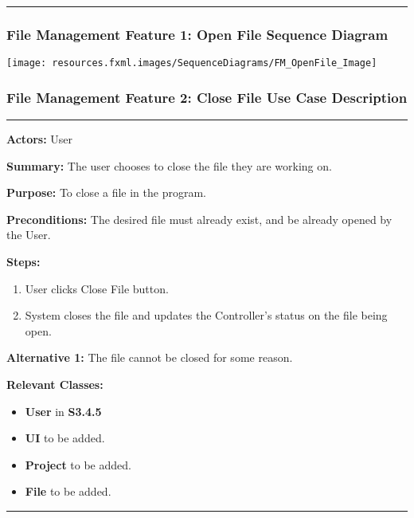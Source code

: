 \documentclass[twoside,letterpaper]{article}
\begin{document}
\hrule

\newpage

\subsubsection[File Management Feature 1: Open File Sequence Diagram]{\rmfamily\bfseries\color{black}
	File Management Feature 1: Open File Sequence Diagram}
\hypertarget{RefHeading22059017292}{}

\bigskip

\texttt{[image: resources.fxml.images/SequenceDiagrams/FM\_OpenFile\_Image]}

\newpage

\subsubsection[File Management Feature 2: Close File Use Case Description]{\rmfamily\bfseries\color{black}
	File Management Feature 2: Close File Use Case Description}
\hypertarget{RefHeading22059017292}{}

\vspace{2pt}
\hrule
\vspace{8pt}
\textbf{Actors:} User \newline

\noindent\textbf{Summary:} The user chooses to close the file they are working on. \newline

\noindent\textbf{Purpose:} To close a file in the program. \newline

\noindent\textbf{Preconditions:} The desired file must already exist, and be already opened by the User. \newline

\noindent\textbf{Steps:}
\begin{enumerate}
	\item User clicks Close File button.
	\item System closes the file and updates the Controller's status on the file being open.
\end{enumerate}

\noindent\textbf{Alternative 1:} The file cannot be closed for some reason. \newline

\noindent\textbf{Relevant Classes:}
\begin{itemize}
	\item \textbf{User} in \textbf{S3.4.5}
	\item \textbf{UI} to be added.
	\item \textbf{Project} to be added.
	\item \textbf{File} to be added.
\end{itemize}
\vspace{8pt}
\hrule
\end{document}

